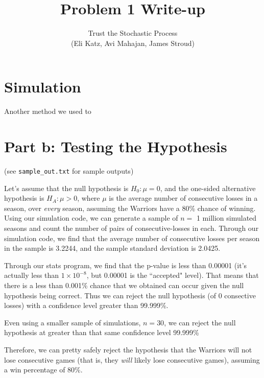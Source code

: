 \documentclass[12pt]{article}
\theoremstyle{nonumberplain}
\begin{document}
 
 
\title{Problem 1 Write-up}%
\author{Trust the Stochastic Process\\
        (Eli Katz, Avi Mahajan, James Stroud)}
 
\maketitle
 
\section{Simulation}
Another method we used to 


\section{Part b: Testing the Hypothesis}
(see \lstinline|sample_out.txt| for sample outputs)

Let's assume that the null hypothesis is $H_0: \mu = 0$, and the one-sided alternative hypothesis is $H_A: \mu > 0$, where $\mu$ is the average number of consecutive losses in a season, over \textit{every} season, assuming the Warriors have a 80\% chance of winning. Using our simulation code, we can generate a sample of $n=$ 1 million simulated seasons and count the number of pairs of consecutive-losses in each. Through our simulation code, we find that the average number of consecutive losses per season in the sample is 3.2244, and the sample standard deviation is 2.0425. 

Through our stats program, we find that the p-value is less than 0.00001 (it's actually less than $1\times 10^{-8}$, but 0.00001 is the ``accepted" level). That means that there is a less than 0.001\% chance that we obtained can occur given the null hypothesis being correct. Thus we can reject the null hypothesis (of 0 consective losses) with a confidence level greater than 99.999\%. 

Even using a smaller sample of simulations, $n=30$, we can reject the null hypothesis at greater than that same confidence level 99.999\%

Therefore, we can pretty safely reject the hypothesis that the Warriors will not lose consecutive games (that is, they \textit{will} likely lose consecutive games), assuming a win percentage of 80\%.
\end{document}
